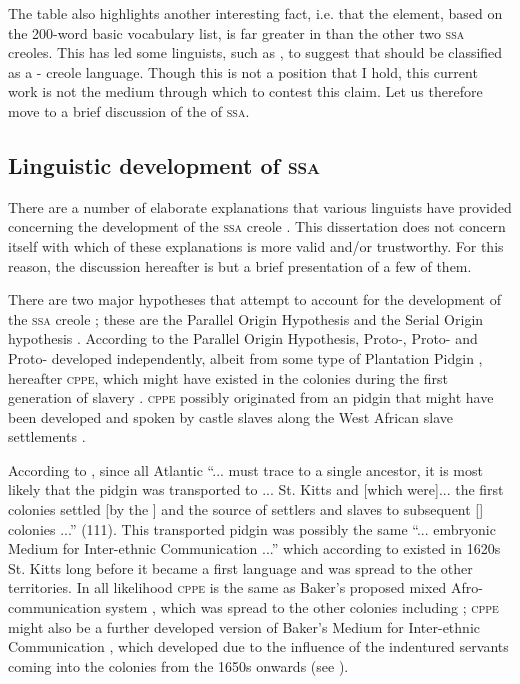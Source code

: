 The table also highlights another interesting fact, i.e. that the  element, based on the 200-word basic vocabulary list, is far greater in  than the other two \textsc{ssa}  creoles. This has led some linguists, such as  \citet{Perl95}, to suggest that  should be classified as a - creole language. Though this is not a position that I hold, this current work is not the medium through which to contest this claim. Let us therefore move to a brief discussion of the  of \textsc{ssa}.

\subsection {Linguistic development of \textsc{ssa} }\label{1.2.3}
There are a number of elaborate explanations that various linguists have provided concerning the development of the \textsc{ssa}  creole . This dissertation does not concern itself with which of these explanations is more valid and/or trustworthy. For this reason, the discussion hereafter is but a brief presentation of a few of them.

There are two major hypotheses that attempt to account for the development of the \textsc{ssa}  creole ; these are the Parallel Origin Hypothesis and the Serial Origin hypothesis \citep{Smith01}. According to the Parallel Origin Hypothesis, Proto-, Proto- and Proto- developed independently, albeit from some type of  Plantation Pidgin , hereafter \textsc{cppe}, which might have existed in the  colonies during the first generation of slavery  \citep{Smith01, McWhorter98}. \textsc{cppe} possibly originated from an  pidgin that might have been developed and spoken by castle slaves along the West African slave settlements \citep{McWhorter00b}.

According to \citet{McWhorter00b}, since all Atlantic   ``... must trace to a single ancestor, it is most likely that the pidgin was transported to ... St. Kitts and  [which were]... the first colonies settled [by the ] and the source of settlers and slaves to subsequent [] colonies ...'' (111). This transported  pidgin was possibly the same ``... embryonic Medium for Inter-ethnic Communication ...'' which according to \citet[347]{Baker98} existed in 1620s St. Kitts long before it became a first language and was spread to the other  territories. In all likelihood \textsc{cppe} is the same as Baker's proposed mixed Afro- communication system \citep{Baker98}, which was spread to the other  colonies including ; \textsc{cppe} might also be a further developed version of Baker’s Medium for Inter-ethnic Communication \citep{Baker98}, which developed due to the influence of the indentured servants coming into the colonies from the 1650s onwards (see ).

